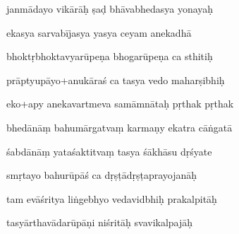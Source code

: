 \documentclass[article,12pt,a4paper]{memoir}%
\newcounter{parCount}
\begin{document}
	  
	  \pstart \leavevmode%
	janmādayo vikārāḥ ṣaḍ bhāvabhedasya yonayaḥ 
	{}
	\pend%
      

	  
	  \pstart \leavevmode%
	ekasya sarvabījasya yasya ceyam anekadhā 
	{}
	\pend%
      

	  
	  \pstart \leavevmode%
	bhoktṛbhoktavyarūpeṇa bhogarūpeṇa ca sthitiḥ 
	{}
	\pend%
      

	  
	  \pstart {} prāptyupāyo+anukāraś ca tasya vedo maharṣibhiḥ 
	{}
	\pend%
      

	  
	  \pstart \leavevmode%
	eko+apy anekavartmeva samāmnātaḥ pṛthak pṛthak 
	{}
	\pend%
      

	  
	  \pstart {} bhedānāṃ bahumārgatvaṃ karmaṇy ekatra cāṅgatā 
	{}
	\pend%
      

	  
	  \pstart \leavevmode%
	śabdānāṃ yataśaktitvaṃ tasya śākhāsu dṛśyate 
	{}
	\pend%
      

	  
	  \pstart {} smṛtayo bahurūpāś ca dṛṣṭādṛṣṭaprayojanāḥ 
	{}
	\pend%
      

	  
	  \pstart \leavevmode%
	tam evāśritya liṅgebhyo vedavidbhiḥ prakalpitāḥ 
	{}
	\pend%
      

	  
	  \pstart {} tasyārthavādarūpāṇi niśritāḥ svavikalpajāḥ 
	{}
	\pend%
      
\end{document}

